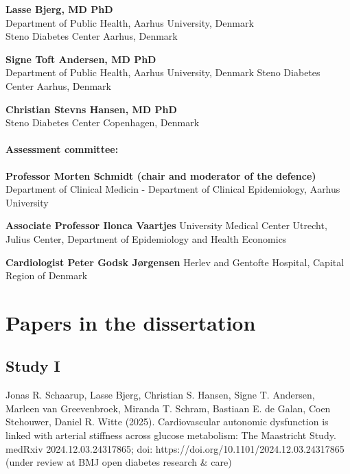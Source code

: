 \documentclass[
  a4paper,
  headsepline=true,
  open=any]{scrbook}
\begin{document}
\textbf{Lasse Bjerg, MD PhD}\\
Department of Public Health, Aarhus University, Denmark\\
Steno Diabetes Center Aarhus, Denmark

\textbf{Signe Toft Andersen, MD PhD}\\
Department of Public Health, Aarhus University, Denmark Steno Diabetes
Center Aarhus, Denmark

\textbf{Christian Stevns Hansen, MD PhD}\\
Steno Diabetes Center Copenhagen, Denmark

\hypertarget{assessment-committee}{%
\subsubsection*{Assessment committee:}\label{assessment-committee}}

\textbf{Professor Morten Schmidt (chair and moderator of the defence)}
Department of Clinical Medicin - Department of Clinical Epidemiology,
Aarhus University

\textbf{Associate Professor Ilonca Vaartjes} University Medical Center
Utrecht, Julius Center, Department of Epidemiology and Health Economics

\textbf{Cardiologist Peter Godsk Jørgensen} Herlev and Gentofte
Hospital, Capital Region of Denmark


\hypertarget{sec-linked-papers}{%
\chapter*{Papers in the dissertation}\label{sec-linked-papers}}


\hypertarget{study-i}{%
\section*{Study I}\label{study-i}}


Jonas R. Schaarup, Lasse Bjerg, Christian S. Hansen, Signe T. Andersen,
Marleen van Greevenbroek, Miranda T. Schram, Bastiaan E. de Galan, Coen
Stehouwer, Daniel R. Witte (2025). Cardiovascular autonomic dysfunction
is linked with arterial stiffness across glucose metabolism: The
Maastricht Study. medRxiv 2024.12.03.24317865; doi:
https://doi.org/10.1101/2024.12.03.24317865 (under review at BMJ open
diabetes research \& care)
\end{document}
